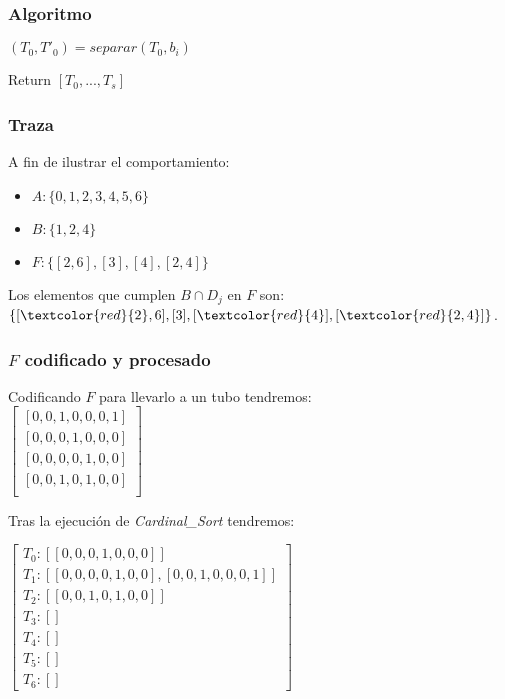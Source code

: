 \documentclass[12pt]{beamer}
\begin{document}
 \begin{frame}
    \frametitle{Algoritmo}
    \begin{algorithmic}[1]
        \State $(T_0, T'_0) = separar(T_0, b_i)$
        
        \EndFor
        \EndFor
        \State Return $[T_0,...,T_s]$
        \EndProcedure
    \end{algorithmic}
 \end{frame}
 \begin{frame}
     \frametitle{Traza}
     A fin de ilustrar el comportamiento:
     \begin{itemize}
        \item $A: \{0, 1, 2, 3, 4, 5, 6\}$
        \item $B: \{1, 2, 4\}$
        \item $F: \{[2, 6], [3], [4], [2, 4]\}$
    \end{itemize}
    Los elementos que cumplen $B\cap D_j$ en $F$ son: $\{[\textcolor{red}{2}, 6], [3], [\textcolor{red}{4}], [\textcolor{red}{2, 4}]\}$.
 \end{frame}
 \begin{frame}
     \frametitle{$F$ codificado y procesado}
     Codificando $F$ para llevarlo a un tubo tendremos: \\
    $
        \begin{bmatrix}
            [0, 0, 1, 0, 0, 0, 1] \\
            [0, 0, 0, 1, 0, 0, 0] \\
            [0, 0, 0, 0, 1, 0, 0] \\
            [0, 0, 1, 0, 1, 0, 0] \\
        \end{bmatrix}
    $
    \par Tras la ejecución de \emph{Cardinal\_Sort} tendremos: \\
    \begin{flushleft}
    $
    \begin{bmatrix}
        T_0: [[0, 0, 0, 1, 0, 0, 0]] \\
        T_1: [[0, 0, 0, 0, 1, 0, 0], [0, 0, 1, 0, 0, 0, 1]] \\
        T_2: [[0, 0, 1, 0, 1, 0, 0]] \\
        T_3: [] \\
        T_4: [] \\
        T_5: [] \\
        T_6: [] 
    \end{bmatrix}
    $
    \end{flushleft}
 \end{frame}
\end{document}
